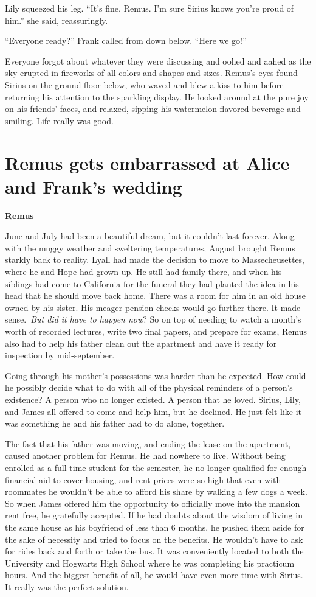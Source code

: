 \documentclass[12pt,twoside,openright]{memoir}
\begin{document}
Lily squeezed his leg. ``It's fine, Remus. I'm sure Sirius knows you're proud of him.'' she said, reassuringly. 

``Everyone ready?'' Frank called from down below. ``Here we go!''

Everyone forgot about whatever they were discussing and oohed and aahed as the sky erupted in fireworks of all colors and shapes and sizes. Remus's eyes found Sirius on the ground floor below, who waved and blew a kiss to him before returning his attention to the sparkling display. He looked around at the pure joy on his friends' faces, and relaxed, sipping his watermelon flavored beverage and smiling. Life really was good.

\chapter{Remus gets embarrassed at Alice and Frank's wedding}

\textbf{Remus} 

June and July had been a beautiful dream, but it couldn't last forever. Along with the muggy weather and sweltering temperatures, August brought Remus starkly back to reality. Lyall had made the decision to move to Massecheusettes, where he and Hope had grown up. He still had family there, and when his siblings had come to California for the funeral they had planted the idea in his head that he should move back home. There was a room for him in an old house owned by his sister. His meager pension checks would go further there. It made sense.\ \textit{But did it have to happen now}? So on top of needing to watch a month's worth of recorded lectures, write two final papers, and prepare for exams, Remus also had to help his father clean out the apartment and have it ready for inspection by mid-september.

Going through his mother's possessions was harder than he expected. How could he possibly decide what to do with all of the physical reminders of a person's existence? A person who no longer existed. A person that he loved. Sirius, Lily, and James all offered to come and help him, but he declined. He just felt like it was something he and his father had to do alone, together.

The fact that his father was moving, and ending the lease on the apartment, caused another problem for Remus. He had nowhere to live. Without being enrolled as a full time student for the semester, he no longer qualified for enough financial aid to cover housing, and rent prices were so high that even with roommates he wouldn't be able to afford his share by walking a few dogs a week. So when James offered him the opportunity to officially move into the mansion rent free, he gratefully accepted. If he had doubts about the wisdom of living in the same house as his boyfriend of less than 6 months, he pushed them aside for the sake of necessity and tried to focus on the benefits. He wouldn't have to ask for rides back and forth or take the bus. It was conveniently located to both the University and Hogwarts High School where he was completing his practicum hours. And the biggest benefit of all, he would have even more time with Sirius. It really was the perfect solution.
\end{document}
